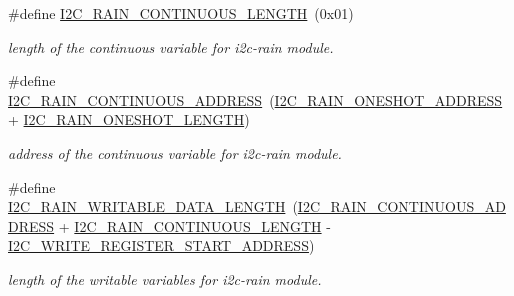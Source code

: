 \begin{DoxyCompactItemize}
\mbox{\label{registers-rain_8h_af592a5990a1a7566488db79011795cef}} 
\#define \hyperlink{registers-rain_8h_af592a5990a1a7566488db79011795cef}{I2\+C\+\_\+\+R\+A\+I\+N\+\_\+\+C\+O\+N\+T\+I\+N\+U\+O\+U\+S\+\_\+\+L\+E\+N\+G\+TH}~(0x01)
\begin{DoxyCompactList}\small\item\em length of the continuous variable for i2c-\/rain module. \end{DoxyCompactList}\item 
\mbox{\label{registers-rain_8h_a75ad23be11d22ec4f3b3d69fcdbf0a64}} 
\#define \hyperlink{registers-rain_8h_a75ad23be11d22ec4f3b3d69fcdbf0a64}{I2\+C\+\_\+\+R\+A\+I\+N\+\_\+\+C\+O\+N\+T\+I\+N\+U\+O\+U\+S\+\_\+\+A\+D\+D\+R\+E\+SS}~(\hyperlink{registers-rain_8h_a6fbaaf0f0fcf13291d7a0699ab260d94}{I2\+C\+\_\+\+R\+A\+I\+N\+\_\+\+O\+N\+E\+S\+H\+O\+T\+\_\+\+A\+D\+D\+R\+E\+SS} + \hyperlink{registers-rain_8h_ad238c864994f79289ba720ca751b8f7d}{I2\+C\+\_\+\+R\+A\+I\+N\+\_\+\+O\+N\+E\+S\+H\+O\+T\+\_\+\+L\+E\+N\+G\+TH})
\begin{DoxyCompactList}\small\item\em address of the continuous variable for i2c-\/rain module. \end{DoxyCompactList}\item 
\mbox{\label{registers-rain_8h_ab18763172e0c3d07bce932542f3e6044}} 
\#define \hyperlink{registers-rain_8h_ab18763172e0c3d07bce932542f3e6044}{I2\+C\+\_\+\+R\+A\+I\+N\+\_\+\+W\+R\+I\+T\+A\+B\+L\+E\+\_\+\+D\+A\+T\+A\+\_\+\+L\+E\+N\+G\+TH}~(\hyperlink{registers-rain_8h_a75ad23be11d22ec4f3b3d69fcdbf0a64}{I2\+C\+\_\+\+R\+A\+I\+N\+\_\+\+C\+O\+N\+T\+I\+N\+U\+O\+U\+S\+\_\+\+A\+D\+D\+R\+E\+SS} + \hyperlink{registers-rain_8h_af592a5990a1a7566488db79011795cef}{I2\+C\+\_\+\+R\+A\+I\+N\+\_\+\+C\+O\+N\+T\+I\+N\+U\+O\+U\+S\+\_\+\+L\+E\+N\+G\+TH} -\/ \hyperlink{registers_8h_ad980dee82f83659f0a84e3e1f3c177bb}{I2\+C\+\_\+\+W\+R\+I\+T\+E\+\_\+\+R\+E\+G\+I\+S\+T\+E\+R\+\_\+\+S\+T\+A\+R\+T\+\_\+\+A\+D\+D\+R\+E\+SS})
\begin{DoxyCompactList}\small\item\em length of the writable variables for i2c-\/rain module. \end{DoxyCompactList}\end{DoxyCompactItemize}
